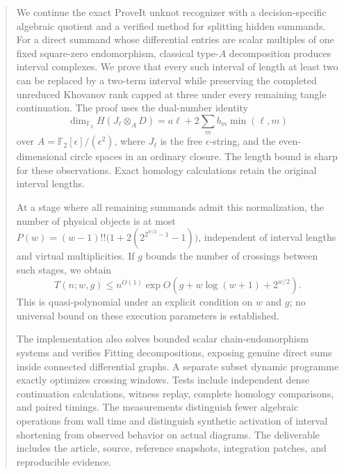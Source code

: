 \begin{abstract}
We continue the exact ProveIt unknot recognizer with a decision-specific
algebraic quotient and a verified method for splitting hidden summands.
For a direct summand whose differential entries are scalar multiples of one
fixed square-zero endomorphism, classical type-$A$ decomposition produces
interval complexes. We prove that every such interval of length at least
two can be replaced by a two-term interval while preserving the completed
unreduced Khovanov rank capped at three under every remaining tangle
continuation. The proof uses the dual-number identity
\[
 \dim_{\mathbb F_2}H(J_\ell\otimes_A D)
   =a\ell+2\sum_m b_m\min(\ell,m)
\]
over $A=\mathbb F_2[\epsilon]/(\epsilon^2)$, where $J_\ell$ is the free
$\epsilon$-string, and the even-dimensional circle spaces in an ordinary closure. The length
bound is sharp for these observations. Exact homology calculations retain
the original interval lengths.

At a stage where all remaining summands admit this normalization, the number
of physical objects is at most
$P(w)=(w-1)!!\bigl(1+2(2^{2^{w/2}-1}-1)\bigr)$,
independent of interval lengths and virtual multiplicities. If $g$ bounds
the number of crossings between such stages, we obtain
\[
 T(n;w,g)\le n^{O(1)}
  \exp O\!\left(g+w\log(w+1)+2^{w/2}\right).
\]
This is quasi-polynomial under an explicit condition on $w$ and $g$;
no universal bound on these execution parameters is established.

The implementation also solves bounded scalar chain-endomorphism systems
and verifies Fitting decompositions, exposing genuine direct sums inside
connected differential graphs. A separate subset dynamic programme exactly
optimizes crossing windows. Tests include independent dense continuation
calculations, witness replay, complete homology comparisons, and paired
timings. The measurements distinguish fewer algebraic operations from wall
time and distinguish synthetic activation of interval shortening from
observed behavior on actual diagrams. The deliverable includes the article,
source, reference snapshots, integration patches, and reproducible evidence.
\end{abstract}
